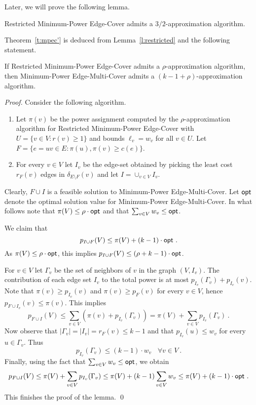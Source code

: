 \documentclass{llncs}
\begin{document}
\vspace{0.2cm}

Later, we will prove the following lemma.

\begin{lemma} \label{l:restricted}
{\sf Restricted Minimum-Power Edge-Cover} admits a $3/2$-approximation algorithm.
\end{lemma}

Theorem~\ref{t:mpec'} is deduced from Lemma~\ref{l:restricted} and the following statement. 

\begin{lemma} \label{l:alpha}
If {\sf Restricted Minimum-Power Edge-Cover} admits a $\rho$-ap\-pro\-ximation algorithm,
then {\sf Minimum-Power Edge-Multi-Cover} admits a $(k-1+\rho)$-approxima\-tion algorithm.
\end{lemma}
\begin{proof}
Consider the following algorithm. 
\begin{enumerate}
\item 
Let $\pi(v)$ be the power assignment computed by the 
$\rho$-approximation algorithm for {\sf Restricted Minimum-Power Edge-Cover}  
with $U=\{v \in V:r(v) \geq 1\}$ and bounds $\ell_v = w_v$ for all $v \in U$. 
Let $F=\{e=uv\in E: \pi(u),\pi(v)\geq c(e)\}$.
\item 
For every $v \in V$ let $I_v$ be the edge-set obtained by picking 
the least cost $r_F(v)$ edges in $\delta_{E \setminus F}(v)$ and let 
$I=\cup_{v \in V} I_v$. 
\end{enumerate}
Clearly, $F \cup I$ is a feasible solution to {\sf Minimum-Power Edge-Multi-Cover}.
Let ${\sf opt}$ denote the optimal solution value for {\sf Minimum-Power Edge-Multi-Cover}.
In what follows note that $\pi(V) \leq \rho \cdot {\sf opt}$ and that 
$\sum_{v \in V} w_v \leq {\sf opt}$.

We claim that 
$$p_{I \cup F}(V) \leq \pi(V)+(k-1)\cdot {\sf opt} \ .$$ 
As $\pi(V) \leq \rho \cdot {\sf opt}$, this implies  
$p_{I \cup F}(V) \leq (\rho+k-1) \cdot {\sf opt}$.

For $v \in V$ let $\Gamma_v$ be the set of neighbors of $v$ in the graph $(V,I_v)$. 
The contribution of each edge set $I_v$ to the total power is at most 
$p_{I_v}(\Gamma_v)+p_{I_v}(v)$.
Note that $\pi(v) \geq p_{I_v}(v)$ and $\pi(v) \geq p_F(v)$ for every $v \in V$,
hence $p_{F \cup I_v}(v) \leq \pi(v)$.
This implies 
$$
p_{F \cup I}(V) \leq \sum_{v \in V} (\pi(v) + p_{I_v}(\Gamma_v)) = \pi(V)+\sum_{v \in V} p_{I_v}(\Gamma_v) \ .
$$
Now observe that 
$|\Gamma_v|=|I_v| = r_F(v) \leq k-1$ and that $p_{I_v}(u) \leq w_v$
for every $u \in \Gamma_v$.
Thus 
$$p_{I_v}(\Gamma_v) \leq (k-1) \cdot w_v \ \ \ \ \forall v \in V \ .$$
Finally, using the fact that $\sum_{v \in V} w_v \leq {\sf opt}$, we obtain
$$
p_{F \cup I}(V) \leq \pi(V) + \sum_{v \in V} p_{I_v}(\Gamma_v) \leq 
\pi(V)+(k-1)\sum_{v \in V} w_v \leq \pi(V)+(k-1)\cdot {\sf opt} \ .
$$
This finishes the proof of the lemma. \qed
\end{proof}
\end{document}
